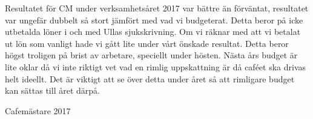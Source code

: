 \documentclass[../_main/handlingar.tex]{subfiles}
\begin{document}
Resultatet för CM under verksamhetsåret 2017 var bättre än förväntat, resultatet var ungefär dubbelt så stort jämfört med vad vi budgeterat. Detta beror på icke utbetalda löner i och med Ullas sjukskrivning. Om vi räknar med att vi betalat ut lön som vanligt hade vi gått lite under vårt önskade resultat. Detta beror högst troligen på brist av arbetare, speciellt under hösten. Nästa års budget är lite oklar då vi inte riktigt vet vad en rimlig uppskattning är då caféet ska drivas helt ideellt. Det är viktigt att se över detta under året så att rimligare budget kan sättas till året därpå.

\begin{signatures}{1}
    \mvh
    \signature{Daniel Bakic}{Cafemästare 2017}
\end{signatures}
\end{document}
